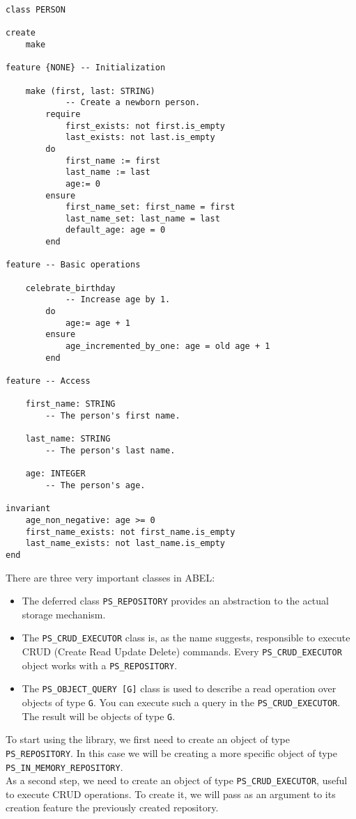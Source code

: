 \documentclass[a4paper,12pt]{report}
\begin{document}
\begin{lstlisting}[language=OOSC2Eiffel, captionpos=b, caption={The PERSON class}, label={lst:person_class}]
class PERSON

create
	make

feature {NONE} -- Initialization

	make (first, last: STRING)
			-- Create a newborn person.
		require
			first_exists: not first.is_empty
			last_exists: not last.is_empty
		do
			first_name := first
			last_name := last
			age:= 0
		ensure
			first_name_set: first_name = first
			last_name_set: last_name = last
			default_age: age = 0
		end

feature -- Basic operations

	celebrate_birthday
			-- Increase age by 1.
		do
			age:= age + 1
		ensure
			age_incremented_by_one: age = old age + 1
		end

feature -- Access

	first_name: STRING
		-- The person's first name.

	last_name: STRING
		-- The person's last name.

	age: INTEGER
		-- The person's age.

invariant
	age_non_negative: age >= 0
	first_name_exists: not first_name.is_empty
	last_name_exists: not last_name.is_empty
end

\end{lstlisting}

There are three very important classes in ABEL:
\begin{itemize}
 \item The deferred class \lstinline!PS_REPOSITORY! provides an abstraction to the actual storage mechanism.
 \item The \lstinline!PS_CRUD_EXECUTOR! class is, as the name suggests, responsible to execute CRUD (Create Read Update Delete) commands. Every \lstinline!PS_CRUD_EXECUTOR! object works with a \lstinline!PS_REPOSITORY!.

 \item The \lstinline!PS_OBJECT_QUERY [G]! class is used to describe a read operation over objects of type \lstinline!G!. You can execute such a query in the \lstinline!PS_CRUD_EXECUTOR!. 
	The result will be objects of type \lstinline!G!.

 
\end{itemize}
To start using the library, we first need to create an object of type\\
\lstinline!PS_REPOSITORY!. In this case we will be creating a more specific object of type \lstinline!PS_IN_MEMORY_REPOSITORY!. \\
As a second step, we need to create an object of type  \lstinline{PS_CRUD_EXECUTOR}, useful to execute CRUD operations. To create it, we will pass as an argument to its creation feature the previously created repository.
\end{document}
